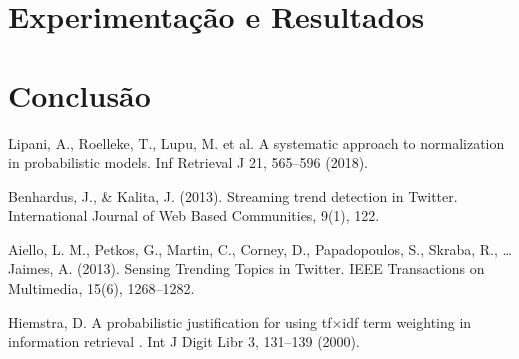 \documentclass[runningheads]{llncs}
\begin{document}
\section{Experimentação e Resultados}


\section{Conclusão}
%
%
%
% 
% 
%
\begin{thebibliography}{8}
Lipani, A., Roelleke, T., Lupu, M. et al. A systematic approach to normalization in probabilistic models. Inf Retrieval J 21, 565–596 (2018). 

Benhardus, J., \& Kalita, J. (2013). Streaming trend detection in Twitter. International Journal of Web Based Communities, 9(1), 122. 

Aiello, L. M., Petkos, G., Martin, C., Corney, D., Papadopoulos, S., Skraba, R., … Jaimes, A. (2013). Sensing Trending Topics in Twitter. IEEE Transactions on Multimedia, 15(6), 1268–1282.  

Hiemstra, D. A probabilistic justification for using tf×idf term weighting in information retrieval . Int J Digit Libr 3, 131–139 (2000). 
\end{thebibliography}
\end{document}
